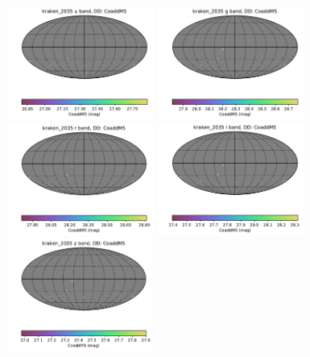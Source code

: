 \documentclass[DM,authoryear,toc]{lsstdoc}
\begin{document}
\begin{figure}[ht]
\centering
\includegraphics[width=0.43\textwidth]{figures/kraken_2035_CoaddM5_u_band_DD_HEAL_SkyMap.pdf}
\includegraphics[width=0.43\textwidth]{figures/kraken_2035_CoaddM5_g_band_DD_HEAL_SkyMap.pdf} \\
\includegraphics[width=0.43\textwidth]{figures/kraken_2035_CoaddM5_r_band_DD_HEAL_SkyMap.pdf}
\includegraphics[width=0.43\textwidth]{figures/kraken_2035_CoaddM5_i_band_DD_HEAL_SkyMap.pdf} \\
\includegraphics[width=0.43\textwidth]{figures/kraken_2035_CoaddM5_z_band_DD_HEAL_SkyMap.pdf}

\end{figure}
\end{document}
